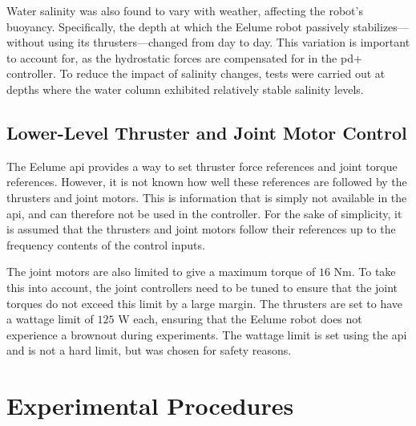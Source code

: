 Water salinity was also found to vary with weather, affecting the robot's 
buoyancy. Specifically, the depth at which the Eelume robot passively 
stabilizes—without using its thrusters—changed from day to day. This variation 
is important to account for, as the hydrostatic forces are compensated for in 
the \gls{pd+} controller. To reduce the impact of salinity changes, tests were 
carried out at depths where the water column exhibited relatively stable 
salinity levels.

\subsection*{Lower-Level Thruster and Joint Motor Control}
The Eelume \gls{api} provides a way to set thruster force references and joint
torque references. However, it is not known how well these references are
followed by the thrusters and joint motors. This is information that is simply
not available in the \gls{api}, and can therefore not be used in the controller.
For the sake of simplicity, it is assumed that the thrusters and joint motors
follow their references up to the frequency contents of the control inputs.

The joint motors are also limited to give a maximum torque of \(16\) Nm. To take
this into account, the joint controllers need to be tuned to ensure that the
joint torques do not exceed this limit by a large margin. The thrusters are set
to have a wattage limit of \(125\) W each, ensuring that the Eelume robot does
not experience a brownout during experiments. The wattage limit is set using the
\gls{api} and is not a hard limit, but was chosen for safety reasons.

\section{Experimental Procedures}

